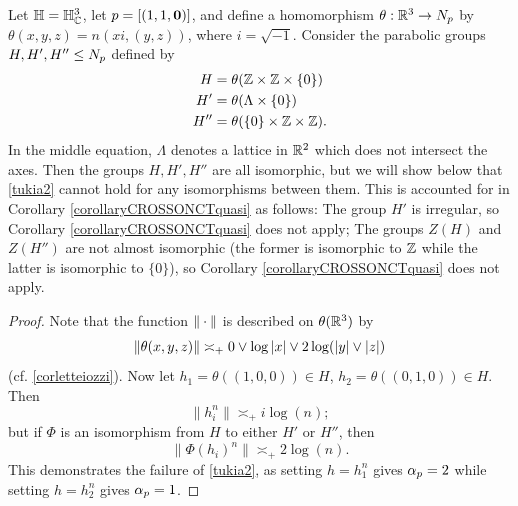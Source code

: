 {\begin{example}
\label{exampletukia}
Let $\H = \H_\C^3$, let $p = [(1,1,\mathbf 0)]$, and define a homomorphism $\theta:\R^3\to N_\bp$ by $\theta(x,y,z) = n(xi ,(y,z))$, where $i = \sqrt{-1}$. Consider the parabolic groups $H,H',H''\leq N_p$ defined by
\begin{align*}
H &= \theta(\Z\times\Z\times\{0\})\\
H' &= \theta(\Lambda\times\{0\})\\
H'' &= \theta(\{0\}\times\Z\times\Z).
\end{align*}
In the middle equation, $\Lambda$ denotes a lattice in $\R^2$ which does not intersect the axes. Then the groups $H,H',H''$ are all isomorphic, but we will show below that \eqref{tukia2} cannot hold for any isomorphisms between them. This is accounted for in Corollary \ref{corollaryCROSSONCTquasi} as follows: The group $H'$ is irregular, so Corollary \ref{corollaryCROSSONCTquasi} does not apply; The groups $Z(H)$ and $Z(H'')$ are not almost isomorphic (the former is isomorphic to $\Z$ while the latter is isomorphic to $\{0\}$), so Corollary \ref{corollaryCROSSONCTquasi} does not apply.%
\end{example}
\begin{proof}
Note that the function $\|\cdot\|$ is described on $\theta(\R^3)$ by
\[
\|\theta(x,y,z)\| \asymp_+ 0\vee \log|x|\vee 2\log(|y|\vee|z|)
\]
(cf. \eqref{corletteiozzi}). Now let $h_1 = \theta((1,0,0)) \in H$, $h_2 = \theta((0,1,0))\in H$. Then
\[
\|h_i^n\| \asymp_\plus i \log(n);
\]
but if $\Phi$ is an isomorphism from $H$ to either $H'$ or $H''$, then
\[
\|\Phi(h_i)^n\| \asymp_\plus 2 \log(n).
\]
This demonstrates the failure of \eqref{tukia2}, as setting $h = h_1^n$ gives $\alpha_p = 2$ while setting $h = h_2^n$ gives $\alpha_p = 1$.


\end{proof}}

